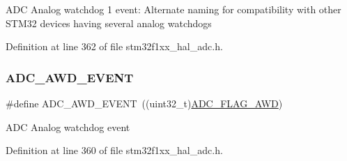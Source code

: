 A\+DC Analog watchdog 1 event\+: Alternate naming for compatibility with other S\+T\+M32 devices having several analog watchdogs 

Definition at line 362 of file stm32f1xx\+\_\+hal\+\_\+adc.\+h.

\mbox{\label{group___a_d_c___event__type_ga2d1d545ea1bfecba7a7081be6ef2cb93}} 
\subsubsection{\texorpdfstring{A\+D\+C\+\_\+\+A\+W\+D\+\_\+\+E\+V\+E\+NT}{ADC\_AWD\_EVENT}}
{\footnotesize\ttfamily \#define A\+D\+C\+\_\+\+A\+W\+D\+\_\+\+E\+V\+E\+NT~((uint32\+\_\+t)\hyperlink{group___a_d_c__flags__definition_gadb75a4b430fb84950232b7a8f3a6a877}{A\+D\+C\+\_\+\+F\+L\+A\+G\+\_\+\+A\+WD})}

A\+DC Analog watchdog event 

Definition at line 360 of file stm32f1xx\+\_\+hal\+\_\+adc.\+h.

